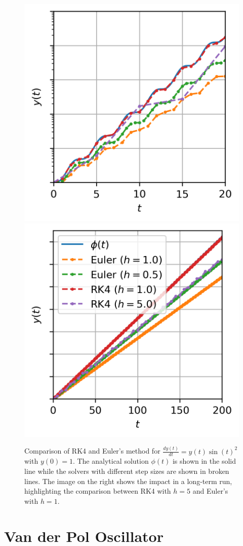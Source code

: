 \begin{figure}[h]
    \centering
    \includegraphics{images/ode_solver_comparison_zoom.png}
    \includegraphics{images/ode_solver_comparison.png}
    \caption{Comparison of RK4 and Euler's method for $\frac{d y\left( t \right) }{dt} = y(t)\sin(t)^2$ with $y(0)=1$. The analytical solution $\phi(t)$ is shown in the solid line while the solvers with different step sizes are shown in broken lines. The image on the right shows the impact in a long-term run, highlighting the comparison between RK4 with $h=5$ and Euler's with $h=1$.}
    \label{fig:ode_comparison}
\end{figure}

\section{Van der Pol Oscillator}

